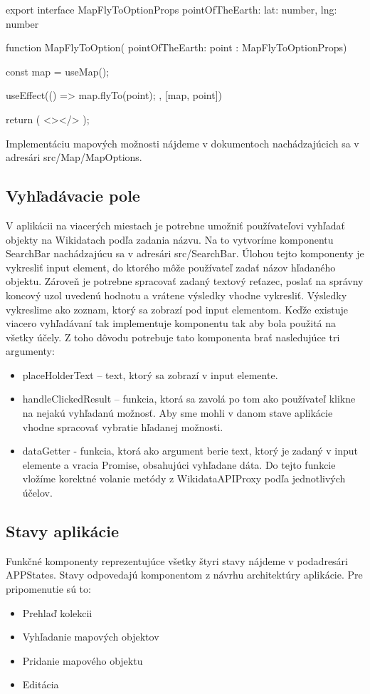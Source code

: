 \begin{code}
export interface MapFlyToOptionProps {
    pointOfTheEarth: { lat: number, lng: number }
}

function MapFlyToOption({ pointOfTheEarth: point }: MapFlyToOptionProps) {
    const map = useMap();

    useEffect(() => {
        map.flyTo(point);
    }, [map, point])

    return (
        <></>
    );
}
\end{code}

Implementáciu mapových možnosti nájdeme v dokumentoch nachádzajúcich sa v adresári src/Map/MapOptions. 

\subsection*{Vyhľadávacie pole}
V aplikácii na viacerých miestach je potrebne umožniť používateľovi vyhľadať objekty na Wikidatach podľa zadania názvu. Na to vytvoríme komponentu SearchBar nachádzajúcu sa v adresári src/SearchBar. 
Úlohou tejto komponenty je vykresliť input element, do ktorého môže používateľ zadať názov hľadaného objektu. Zároveň je potrebne spracovať zadaný textový reťazec, poslať na správny koncový uzol  
uvedenú hodnotu a vrátene výsledky vhodne vykresliť. Výsledky vykreslime ako zoznam, ktorý sa zobrazí pod input elementom. Keďže existuje viacero vyhľadávaní tak implementuje komponentu tak aby bola použitá na všetky účely. 
Z toho dôvodu potrebuje tato komponenta brať nasledujúce tri argumenty: 
\begin{itemize}
      \item placeHolderText – text, ktorý sa zobrazí v input elemente.  
      \item handleClickedResult – funkcia, ktorá sa zavolá po tom ako používateľ klikne na nejakú vyhľadanú možnosť. Aby sme mohli v danom stave aplikácie vhodne spracovať vybratie hľadanej možnosti. 
      \item dataGetter - funkcia, ktorá ako argument berie text, ktorý je zadaný v input elemente a vracia Promise, obsahujúci vyhľadane dáta. Do tejto funkcie vložíme korektné volanie metódy z WikidataAPIProxy podľa jednotlivých účelov. 
\end{itemize}

\subsection*{Stavy aplikácie}
Funkčné komponenty reprezentujúce všetky štyri stavy nájdeme v podadresári APPStates.  
Stavy odpovedajú komponentom z návrhu architektúry aplikácie. Pre pripomenutie sú to: 
\begin{itemize}
      \item Prehlaď kolekcii
      \item Vyhľadanie mapových objektov
      \item Pridanie mapového objektu
      \item Editácia
\end{itemize}

